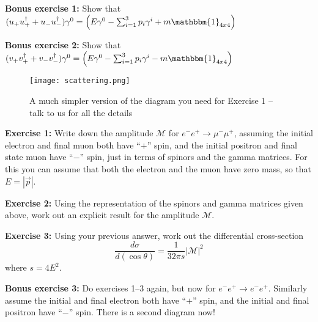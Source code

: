 \documentclass[a4paper,11pt]{article}
\numberwithin{equation}{section} %
\begin{document}
\textbf{Bonus exercise 1:} Show that $(u_+ u_+^\dagger + u_- u_-^\dagger) \gamma^0 = \left( E \gamma^0  - \sum_{i=1}^{3} p_i \gamma^i + m \mathbbm{1}_{4x4} \right)$

\textbf{Bonus exercise 2:} Show that $(v_+ v_+^\dagger + v_- v_-^\dagger) \gamma^0 = \left( E \gamma^0  - \sum_{i=1}^{3} p_i \gamma^i - m \mathbbm{1}_{4x4} \right)$

\begin{figure}
\begin{center}
\texttt{[image: scattering.png]}
\end{center}
\caption{A much simpler version of the diagram you need for Exercise 1 -- talk to us for all the details}
\end{figure}



\textbf{Exercise 1:} Write down the amplitude $\mathcal{M}$ for $e^- e^+ \to \mu^- \mu^+$, assuming the initial electron and final muon both have ``$+$'' spin, and the initial positron and final state muon have ``$-$'' spin, just in terms of spinors and the gamma matrices.
For this you can assume that both the electron and the muon have zero mass, so that $E = |\overrightarrow{p}|$.

\textbf{Exercise 2:} Using the representation of the spinors and gamma matrices given above, work out an explicit result for the amplitude $\mathcal{M}$.

\textbf{Exercise 3:} Using your previous answer, work out the differential cross-section
\begin{equation}
\frac{d \sigma}{d (\cos \theta)} = \frac{1}{32 \pi s} |\mathcal{M}|^2
\end{equation}
where $s = 4 E^2$.

\textbf{Bonus exercise 3:} Do exercises 1--3 again, but now for $e^- e^+ \to e^- e^+$. Similarly assume the initial and final electron both have ``$+$'' spin, and the initial and final positron have ``$-$'' spin. There is a second diagram now!
\end{document}
